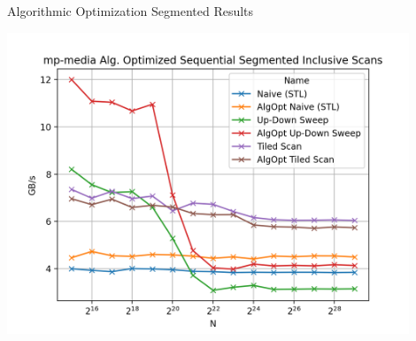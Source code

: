 \begin{frame}{Algorithmic Optimization Segmented Results}
 
  \centering
  \vspace{-5pt}
  \includegraphics[width=0.90\textwidth]{"graphs/mp-media Alg. Optimized Sequential Segmented Inclusive Scans"}
 
\end{frame}

